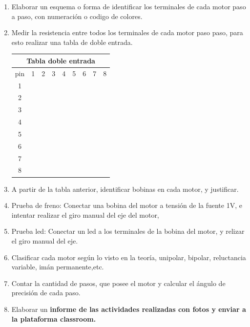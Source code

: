 \documentclass[../main]{subfiles}
\begin{document}
\begin{enumerate}
    \item Elaborar un esquema o forma de identificar los terminales de cada motor paso a paso, con numeración o codigo de colores.
    \item Medir la resistencia entre todos los terminales de cada motor paso paso, para esto realizar una tabla de doble entrada.
    
    \begin{center}    
\begin{tabular}{|c||c|c|c|c|c|c|c|c |}
\hline
\multicolumn{9}{|c|}{Tabla doble entrada} \\
\hline\hline
pin & 1 & 2 & 3 & 4 & 5 & 6 & 7 &8\\
\hline\hline
1 & & & & & & & &\\
\hline
2 & & & & & & & &\\
\hline
3 & & & & & & & &\\
\hline
4 & & & & & & & &\\
\hline
5 & & & & & & & &\\
\hline
6 & & & & & & & &\\
\hline
7 & & & & & & & &\\
\hline
8 & & & & & & & &\\
\hline
\end{tabular}
\end{center}

    
    \item A partir de la tabla anterior, identificar bobinas en cada motor, y justificar.
    \item Prueba de freno: Conectar una bobina del motor a tensión de la fuente 1V, e intentar realizar el giro manual del eje del motor,
    \item Prueba led: Conectar un led a los terminales de la bobina del motor, y relizar el giro manual del eje.
    \item Clasificar cada motor según lo visto en la teoría, unipolar, bipolar, reluctancia variable, imán permanente,etc.
    \item Contar la cantidad de pasos, que posee el motor y calcular el ángulo de precisión de cada paso.
    \item Elaborar un \bf{informe} de las actividades realizadas con fotos y enviar a la plataforma classroom.
\end{enumerate}
\end{document}

